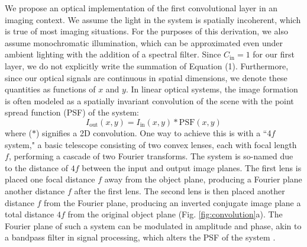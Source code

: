 \documentclass[fleqn,10pt]{wlscirep}
\begin{document}
We propose an optical implementation of the first convolutional layer in an imaging context. We assume the light in the system is spatially incoherent, which is true of most imaging situations. For the purposes of this derivation, we also assume monochromatic illumination, which can be approximated even under ambient lighting with the addition of a spectral filter. Since $C_\text{in} = 1$ for our first layer, we do not explicitly write the summation of Equation (1). Furthermore, since our optical signals are continuous in spatial dimensions, we denote these quantities as functions of $x$ and $y$. In linear optical systems, the image formation is often modeled as a spatially invariant convolution of the scene with the point spread function (PSF) of the system:
\begin{equation}
I_\text{out}(x,y)  = I_\text{in}(x,y) * \text{PSF}(x,y)
\end{equation}
where ($*$) signifies a 2D convolution. One way to achieve this is with a ``4$f$ system," a basic telescope consisting of two convex lenses, each with focal length $f$, performing a cascade of two Fourier transforms. The system is so-named due to the distance of $4f$ between the input and output image planes. The first lens is placed one focal distance $f$ away from the object plane, producing a Fourier plane another distance $f$ after the first lens. The second lens is then placed another distance $f$ from the Fourier plane, producing an inverted conjugate image plane a total distance $4f$ from the original object plane (Fig. \ref{fig:convolution}a). The Fourier plane of such a system can be modulated in amplitude and phase, akin to a bandpass filter in signal processing, which alters the PSF of the system \cite{goodman2008introduction}.
\end{document}
